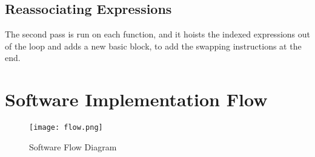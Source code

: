 \subsection{Reassociating Expressions}
The second pass is run on each function, and it hoists the indexed expressions out of the loop and adds a new basic block, to add the swapping instructions at the end. 
\section{Software Implementation Flow}

\begin{figure}[H]
	\centering
	\texttt{[image: flow.png]}
	\caption{Software Flow Diagram}
	\label{Software Flow}	
\end{figure}
